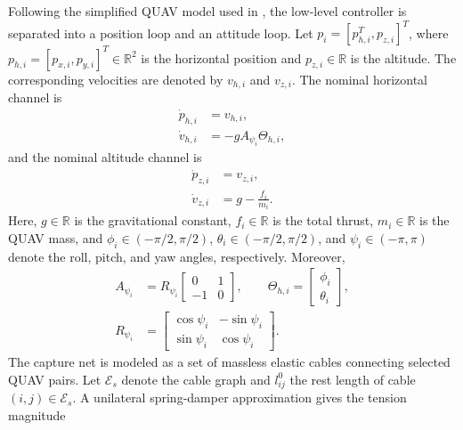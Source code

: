 \documentclass[letterpaper,journal]{IEEEtran}
\theoremstyle{plain}
\theoremstyle{definition}
\theoremstyle{remark}
\begin{document}
Following the simplified QUAV model used in \cite{li2025localInfo}, the low-level controller is separated into a position loop and an attitude loop. Let \(p_i=[p_{h,i}^T,p_{z,i}]^T\), where \(p_{h,i}=[p_{x,i},p_{y,i}]^T\in\mathbb R^2\) is the horizontal position and \(p_{z,i}\in\mathbb R\) is the altitude. The corresponding velocities are denoted by \(v_{h,i}\) and \(v_{z,i}\). The nominal horizontal channel is
\begin{equation}
\begin{aligned}
\dot p_{h,i}&=v_{h,i},\\
\dot v_{h,i}&=-gA_{\psi_i}\Theta_{h,i},
\end{aligned}
\label{eq:quadrotor-nominal-horizontal}
\end{equation}
and the nominal altitude channel is
\begin{equation}
\begin{aligned}
\dot p_{z,i}&=v_{z,i},\\
\dot v_{z,i}&=g-\frac{f_i}{m_i}.
\end{aligned}
\label{eq:quadrotor-nominal-altitude}
\end{equation}
Here, \(g\in\mathbb R\) is the gravitational constant, \(f_i\in\mathbb R\) is the total thrust, \(m_i\in\mathbb R\) is the QUAV mass, and \(\phi_i\in(-\pi/2,\pi/2)\), \(\theta_i\in(-\pi/2,\pi/2)\), and \(\psi_i\in(-\pi,\pi)\) denote the roll, pitch, and yaw angles, respectively. Moreover,
\begin{equation}
\begin{aligned}
A_{\psi_i}&=R_{\psi_i}
\begin{bmatrix}
0&1\\
-1&0
\end{bmatrix},\qquad
\Theta_{h,i}=
\begin{bmatrix}
\phi_i\\
\theta_i
\end{bmatrix},\\
R_{\psi_i}&=
\begin{bmatrix}
\cos\psi_i&-\sin\psi_i\\
\sin\psi_i&\cos\psi_i
\end{bmatrix}.
\end{aligned}
\label{eq:horizontal-attitude-map}
\end{equation}
The capture net is modeled as a set of massless elastic cables connecting selected QUAV pairs. Let \(\mathcal E_s\) denote the cable graph and \(l_{ij}^0\) the rest length of cable \((i,j)\in\mathcal E_s\). A unilateral spring-damper approximation gives the tension magnitude
\end{document}
